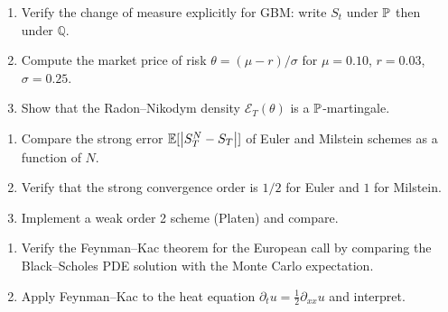 \begin{exercise}
\begin{enumerate}
    \item Verify the change of measure explicitly for GBM: write $S_t$
          under $\mathbb{P}$ then under $\mathbb{Q}$.
    \item Compute the market price of risk $\theta = (\mu-r)/\sigma$
          for $\mu = 0.10$, $r = 0.03$, $\sigma = 0.25$.
    \item Show that the Radon--Nikodym density $\mathcal{E}_T(\theta)$
          is a $\mathbb{P}$-martingale.
\end{enumerate}
\end{exercise}

\begin{exercise}
\begin{enumerate}
    \item Compare the strong error $\mathbb{E}[\left| S_T^N - S_T \right|]$ of Euler and
          Milstein schemes as a function of $N$.
    \item Verify that the strong convergence order is $1/2$ for Euler
          and $1$ for Milstein.
    \item Implement a weak order 2 scheme (Platen) and compare.
\end{enumerate}
\end{exercise}

\begin{exercise}
\begin{enumerate}
    \item Verify the Feynman--Kac theorem for the European call by
          comparing the Black--Scholes PDE solution with the Monte Carlo
          expectation.
    \item Apply Feynman--Kac to the heat equation
          $\partial_t u = \frac{1}{2}\partial_{xx}u$ and interpret.
\end{enumerate}
\end{exercise}
